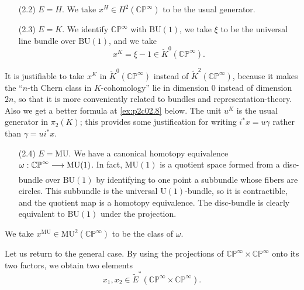 \documentclass[../main]{subfiles}
\begin{document}
\begin{examples}
\begin{enumerate}
    \item[(2.2)] $E = H$. We take $x^H \in H^2(\mathbb {CP}^\infty)$ to be the usual generator.
    \item[(2.3)] $E = K$. We identify $\mathbb {CP}^\infty$ with $\mathrm{BU}(1)$, we take $\xi$ to be the universal line bundle over $\mathrm{BU}(1)$, and we take \[x^K = \xi - 1 \in {\breve K}^0(\mathbb {CP}^\infty).\] 
\end{enumerate}

\begin{notes}
It is justifiable to take $x^K$ in ${\breve K}^0(\mathbb {CP}^\infty)$ instead of ${\tilde K}^2(\mathbb {CP}^\infty)$, because it makes the ``$n$-th Chern class in $K$-cohomology'' lie in dimension 0 instead of dimension $2n$, so that it is more conveniently related to bundles and representation-theory. Also we get a better formula at \ref{ex:p2c02.8} below. The unit $u^K$ is the usual generator in $\pi_2(K)$; this provides some justification for writing $i^\ast x = u \gamma$ rather than $\gamma = u i^\ast x$.
\end{notes}
\end{examples}

\begin{enumerate}
    \item[(2.4)] $E = \mathrm{MU}$. We have a canonical homotopy equivalence $\omega : \mathbb {CP}^\infty \lar{} \mathrm{MU}(1)$. In fact, $\mathrm{MU}(1)$ is a quotient space formed from a disc-bundle over $\mathrm{BU}(1)$ by identifying to one point a subbundle whose fibers are circles. This subbundle is the universal $\mathrm{U}(1)$-bundle, so it is contractible, and the quotient map is a homotopy equivalence. The disc-bundle is clearly equivalent to $\mathrm{BU}(1)$ under the projection. 
\end{enumerate}

We take $x^{\mathrm{MU}} \in \mathrm {MU}^2(\mathbb {CP}^\infty)$ to be the class of $\omega$. 

Let us return to the general case. By using the projections of $\mathbb {CP}^\infty \times \mathbb {CP}^\infty$ onto its two factors, we obtain two elements \[x_1, x_2 \in {\tilde E}^\ast(\mathbb {CP}^\infty \times \mathbb {CP}^\infty).\]
\end{document}

